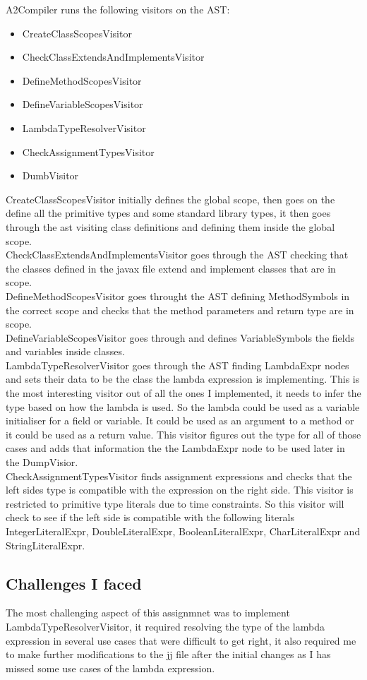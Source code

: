 \documentclass[twocolumn,notitlepage]{report}
\begin{document}
A2Compiler runs the following visitors on the AST:
\begin{itemize}
\item CreateClassScopesVisitor
\item CheckClassExtendsAndImplementsVisitor
\item DefineMethodScopesVisitor
\item DefineVariableScopesVisitor
\item LambdaTypeResolverVisitor
\item CheckAssignmentTypesVisitor
\item DumbVisitor
\end{itemize}
CreateClassScopesVisitor initially defines the global scope, then goes on the
define all the primitive types and some standard library types, it then goes
through the ast visiting class definitions and defining them inside the global
scope.\\
CheckClassExtendsAndImplementsVisitor goes through the AST checking that the
classes defined in the javax file extend and implement classes that are in
scope.\\
DefineMethodScopesVisitor goes throught the AST defining MethodSymbols in the
correct scope and checks that the method parameters and return type are in
scope.\\
DefineVariableScopesVisitor goes through and defines VariableSymbols the fields
and variables inside classes.\\
LambdaTypeResolverVisitor goes through the AST finding LambdaExpr nodes and
sets their data to be the class the lambda expression is implementing. This is
the most interesting visitor out of all the ones I implemented, it needs to
infer the type based on how the lambda is used. So the lambda could be used as
a variable initialiser for a field or variable. It could be used as an argument
to a method or it could be used as a return value. This visitor figures out the
type for all of those cases and adds that information the the LambdaExpr node
to be used later in the DumpVisior.\\
CheckAssignmentTypesVisitor finds assignment expressions and checks that the
left sides type is compatible with the expression on the right side. This
visitor is restricted to primitive type literals due to time constraints.  So
this visitor will check to see if the left side is compatible with the
following literals IntegerLiteralExpr, DoubleLiteralExpr, BooleanLiteralExpr,
CharLiteralExpr and StringLiteralExpr.

\subsection*{Challenges I faced}
The most challenging aspect of this assignmnet was to implement
LambdaTypeResolverVisitor, it required resolving the type of the lambda
expression in several use cases that were difficult to get right, it also
required me to make further modifications to the jj file after the initial
changes as I has missed some use cases of the lambda expression.




\end{document}
